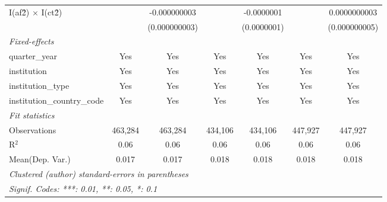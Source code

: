 \begin{tabular}{lcccccc}
   I(af\^2) $\times$ I(ct\^2)         &                & -0.000000003    &                & -0.0000001      &                & 0.0000000003\\   
                                      &                & (0.000000003)   &                & (0.0000001)     &                & (0.000000005)\\   
   \midrule
   \emph{Fixed-effects}\\
   quarter\_year                      & Yes            & Yes             & Yes            & Yes             & Yes            & Yes\\  
   institution                        & Yes            & Yes             & Yes            & Yes             & Yes            & Yes\\  
   institution\_type                  & Yes            & Yes             & Yes            & Yes             & Yes            & Yes\\  
   institution\_country\_code         & Yes            & Yes             & Yes            & Yes             & Yes            & Yes\\  
   \midrule
   \emph{Fit statistics}\\
   Observations                       & 463,284        & 463,284         & 434,106        & 434,106         & 447,927        & 447,927\\  
   R$^2$                              & 0.06           & 0.06            & 0.06           & 0.06            & 0.06           & 0.06\\  
Mean(Dep. Var.) & 0.017 & 0.017 & 0.018 & 0.018 & 0.018 & 0.018 \\
   \midrule \midrule
   \multicolumn{7}{l}{\emph{Clustered (author) standard-errors in parentheses}}\\
   \multicolumn{7}{l}{\emph{Signif. Codes: ***: 0.01, **: 0.05, *: 0.1}}\\
\end{tabular}
\par\endgroup
